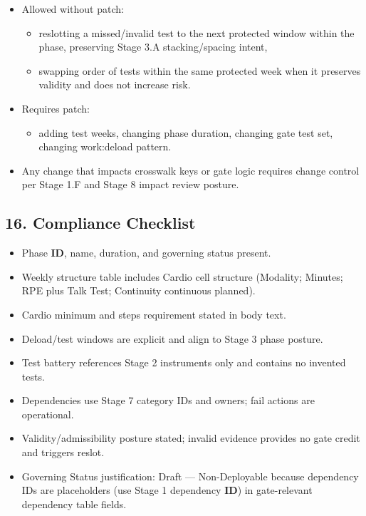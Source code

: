 \documentclass[10pt]{article}
\begin{document}
\begin{itemize}
\item Allowed without patch:
  \begin{itemize}
  \item reslotting a missed/invalid test to the next protected window within the phase, preserving Stage 3.A stacking/spacing intent,
  \item swapping order of tests within the same protected week when it preserves validity and does not increase risk.
  \end{itemize}
\item Requires patch:
  \begin{itemize}
  \item adding test weeks, changing phase duration, changing gate test set, changing work:deload pattern.
  \end{itemize}
\item Any change that impacts crosswalk keys or gate logic requires change control per Stage 1.F and Stage 8 impact review posture.
\end{itemize}

\subsection*{16. Compliance Checklist}

\begin{itemize}
\item Phase \textbf{ID}, name, duration, and governing status present.
\item Weekly structure table includes Cardio cell structure (Modality; Minutes; RPE plus Talk Test; Continuity continuous planned).
\item Cardio minimum and steps requirement stated in body text.
\item Deload/test windows are explicit and align to Stage 3 phase posture.
\item Test battery references Stage 2 instruments only and contains no invented tests.
\item Dependencies use Stage 7 category IDs and owners; fail actions are operational.
\item Validity/admissibility posture stated; invalid evidence provides no gate credit and triggers reslot.
\item Governing Status justification: Draft — Non-Deployable because dependency IDs are placeholders (use Stage 1 dependency \textbf{ID}) in gate-relevant dependency table fields.
\end{itemize}
\end{document}
